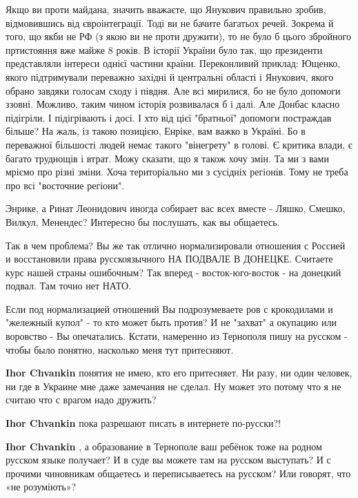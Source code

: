 \begin{itemize}
Якщо ви проти майдана, значить вважаєте, що Янукович правильно зробив,
відмовившись від євроінтеграції. Тоді ви не бачите багатьох речей. Зокрема й
того, що якби не РФ (з якою ви не проти дружити), то не було б цього збройного
пртистояння вже майже 8 років. В історії України було так, що президенти
представляли інтереси однієї частини країни. Переконливий приклад: Ющенко,
якого підтримували переважно західні й центральні області і Янукович, якого
обрано завдяки голосам сходу і півдня. Але всі мирилися, бо не було допомоги
ззовні. Можливо, таким чином історія розвивалася б і далі. Але Донбас класно
підігріли. І підігрівають і досі. І хто від цієї "братньої" допомоги постраждав
більше? На жаль, із такою позицією, Енріке, вам важко в Україні. Бо в
переважної більшості людей немає такого "вінегрету" в голові. Є критика влади,
є багато труднощів і втрат. Можу сказати, що я також хочу змін. Та ми з вами
мріємо про різні зміни. Хоча територіально ми з сусідніх регіонів. Тому не
треба про всі "восточние регіони".


Энрике, а Ринат Леонидович иногда собирает вас всех вместе - Ляшко, Смешко,
Вилкул, Менендес? Интересно бы послушать, как вы общаетесь.


Так в чем проблема? Вы же так отлично нормализировали отношения с Россией и
восстановили права русскоязычного НА ПОДВАЛЕ В ДОНЕЦКЕ. Считаете курс нашей
страны ошибочным? Так вперед - восток-юго-восток - на донецкий подвал. Там
точно нет НАТО.


Если под нормализацией отношений Вы подрозумеваете ров с крокодилами и
"жележный купол" - то кто может быть против? И не "захват" а окупацию или
воровство - Вы опечатались. Кстати, намеренно из Тернополя пишу на русском -
чтобы было понятно, насколько меня тут притесняют.

\begin{itemize} %
\textbf{Ihor Chvankin} понятия не имею, кто его притесняет. Ни разу, ни один человек, ни где в Украине мне даже замечания не сделал. Ну может это потому что я не считаю что с врагом надо дружить?

\textbf{Ihor Chvankin} пока разрешают писать в интернете по-русски?!

\textbf{Ihor Chvankin} , а образование в Тернополе ваш ребёнок тоже на родном русском языке получает? И в суде вы можете там на русском выступать? И с прочими чиновникам общаетесь и переписываетесь на русском? Или говорят, что «не розуміють»?


\end{itemize}
\end{itemize}
